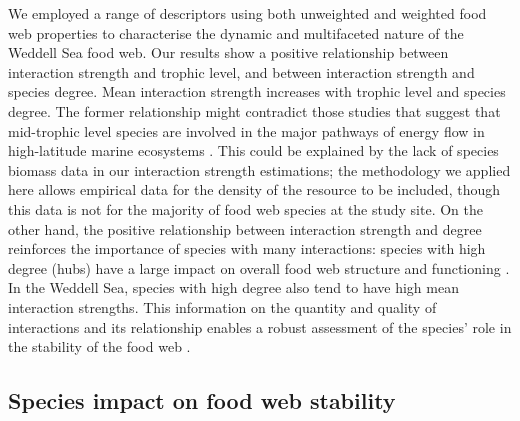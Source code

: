\documentclass[gc, manuscript]{copernicus}
\begin{document}
We employed a range of descriptors using both unweighted and weighted
food web properties to characterise the dynamic and multifaceted nature
of the Weddell Sea food web. Our results show a positive relationship
between interaction strength and trophic level, and between interaction
strength and species degree. Mean interaction strength increases with
trophic level and species degree. The former relationship might
contradict those studies that suggest that mid-trophic level species are
involved in the major pathways of energy flow in high-latitude marine
ecosystems
\citep{Pinkerton2014, Murphy2016, McCormack2020, Riccialdelli2020}. This
could be explained by the lack of species biomass data in our
interaction strength estimations; the methodology we applied here
\citep{Pawar2012} allows empirical data for the density of the resource
to be included, though this data is not for the majority of food web
species at the study site. On the other hand, the positive relationship
between interaction strength and degree reinforces the importance of
species with many interactions: species with high degree (hubs) have a
large impact on overall food web structure and functioning
\citep{Dunne2002a, Kortsch2015}. In the Weddell Sea, species with high
degree also tend to have high mean interaction strengths. This
information on the quantity and quality of interactions and its
relationship enables a robust assessment of the species' role in the
stability of the food web \citep{Cirtwill2018a}.

\subsection{Species impact on food web stability}
\end{document}
